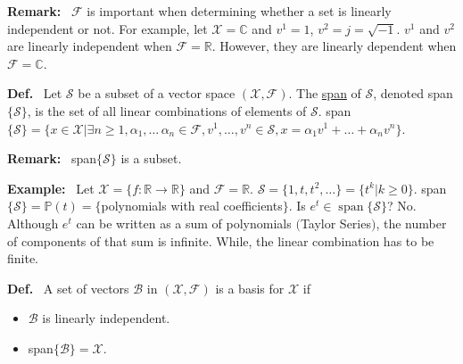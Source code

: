 \documentclass[letterpaper]{article}
\begin{document}
\noindent \textbf{Remark:}~ $\mathcal{F}$ is important when determining whether a set is linearly independent or not. For example, let $\mathcal{X}=\mathbb{C}$ and $v^1=1$, $v^2=j=\sqrt{-1}$. $v^1$ and $v^2$ are linearly independent when $\mathcal{F}=\mathbb{R}$. However, they are linearly dependent when $\mathcal{F}=\mathbb{C}$.

\noindent \textbf{Def.}~ Let $\mathcal{S}$ be a subset of a vector space $(\mathcal{X},\mathcal{F})$. The \underline{span} of $\mathcal{S}$, denoted span$\{\mathcal{S}\}$, is the set of all linear combinations of elements of $\mathcal{S}$.
    \newline
    span$\{\mathcal{S}\}=\{x\in\mathcal{X} | \exists n\geq 1, \alpha_1,\dots\,\alpha_n\in\mathcal{F}, v^1,\dots,v^n\in\mathcal{S}, x=\alpha_1v^1+\dots+\alpha_nv^n\}$.

\noindent \textbf{Remark:}~ span$\{\mathcal{S}\}$ is a subset.

\noindent \textbf{Example:}~ Let $\mathcal{X}=\{f: \mathbb{R}\rightarrow\mathbb{R}\}$ and $\mathcal{F}=\mathbb{R}$. $\mathcal{S}=\{1,t,t^2,\dots\}=\{t^k|k\geq0\}$. span$\{\mathcal{S}\}=\mathbb{P}(t)=\{$polynomials with real coefficients$\}$.
    \newline\newline
    Is $e^t\in \operatorname{span}\{\mathcal{S}\}$?
    No. Although $e^t$ can be written as a sum of polynomials $($Taylor Series$)$, the number of components of that sum is infinite. While, the linear combination has to be finite.

\noindent \textbf{Def.}~ A set of vectors $\mathcal{B}$ in $(\mathcal{X},\mathcal{F})$ is a basis for $\mathcal{X}$ if\begin{itemize}
    \item $\mathcal{B}$ is linearly independent.
    \item span$\{\mathcal{B}\}=\mathcal{X}$.
    \end{itemize}

\newpage
\end{document}
